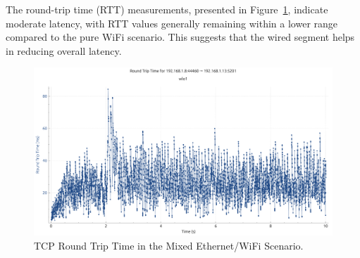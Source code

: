 \begin{enumerate}
                The round-trip time (RTT) measurements, presented in Figure~\ref{fig:rtt-mix-tcp}, indicate moderate latency, with RTT values generally remaining within a lower range compared to the pure WiFi scenario. 
                This suggests that the wired segment helps in reducing overall latency.

                \begin{figure}[ht]
                    \centering
                    \includegraphics[width=0.9\columnwidth]{images/graphs/RTT/RTT_MIX_TCP.pdf}
                    \caption{TCP Round Trip Time in the Mixed Ethernet/WiFi Scenario.}
                    \label{fig:rtt-mix-tcp}
                \end{figure}



            \vspace{0.2cm} %
                

\end{enumerate}
